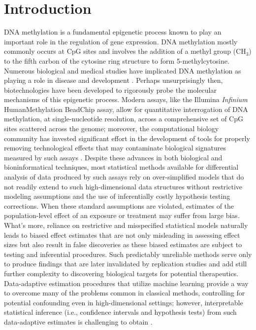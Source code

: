 \documentclass[9pt,a4paper,]{extarticle}
\theoremstyle{definition}
\theoremstyle{definition}
\theoremstyle{definition}
\theoremstyle{remark}
\begin{document}
\clearpage
\pagestyle{main}

\hypertarget{introduction}{%
\section{Introduction}\label{introduction}}

DNA methylation is a fundamental epigenetic process known to play an important
role in the regulation of gene expression. DNA methylation mostly commonly
occurs at CpG sites and involves the addition of a methyl group (\(\text{CH}_3\))
to the fifth carbon of the cytosine ring structure to form 5-methylcytosine.
Numerous biological and medical studies have implicated DNA methylation as
playing a role in disease and development \citep{robertson2005dna}. Perhaps
unsurprisingly then, biotechnologies have been developed to rigorously probe the
molecular mechanisms of this epigenetic process. Modern assays, like the
Illumina \emph{Infinium} HumanMethylation BeadChip assay, allow for quantitative
interrogation of DNA methylation, at single-nucleotide resolution, across a
comprehensive set of CpG sites scattered across the genome; moreover, the
computational biology community has invested significant effort in the
development of tools for properly removing technological effects that may
contaminate biological signatures measured by such assays
\citep[\citet{dedeurwaerder2013comprehensive}]{fortin2014functional}. Despite these
advances in both biological and bioninformatical techniques, most statistical
methods available for differential analysis of data produced by such assays rely
on over-simplified models that do not readily extend to such high-dimensional
data structures without restrictive modeling assumptions and the use of
inferentially costly hypothesis testing corrections. When these standard
assumptions are violated, estimates of the population-level effect of an
exposure or treatment may suffer from large bias. What's more, reliance on
restrictive and misspecified statistical models naturally leads to biased effect
estimates that are not only misleading in assessing effect sizes but also result
in false discoveries as these biased estimates are subject to testing and
inferential procedures. Such predictably unreliable methods serve only to
produce findings that are later invalidated by replication studies and add still
further complexity to discovering biological targets for potential therapeutics.
Data-adaptive estimation procedures that utilize machine learning provide a way
to overcome many of the problems common in classical methods, controlling for
potential confounding even in high-dimensional settings; however, interpretable
statistical inference (i.e., confidence intervals and hypothesis tests) from
such data-adaptive estimates is challenging to obtain \citep{libbrecht2015machine}.
\end{document}
